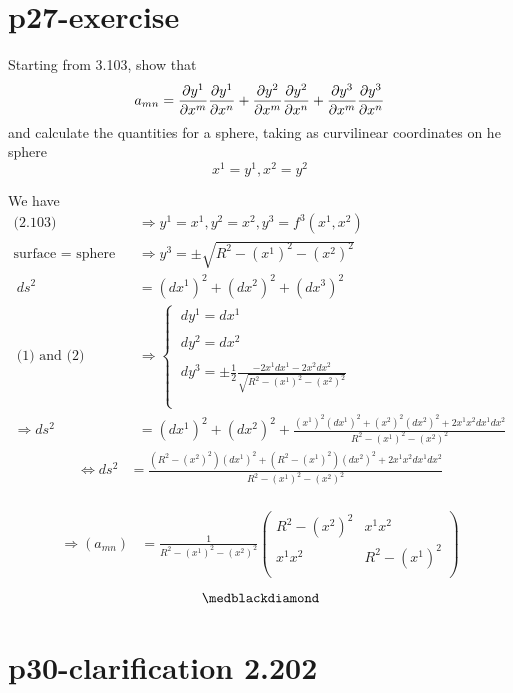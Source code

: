 \section{p27-exercise}

\begin{tcolorbox}
Starting from 3.103, show that $$a_{mn} = \pdv{y^1}{x^m}\pdv{y^1}{x^n}+\pdv{y^2}{x^m}\pdv{y^2}{x^n}+\pdv{y^3}{x^m}\pdv{y^3}{x^n}$$ and calculate the quantities for a sphere, taking as curvilinear coordinates on he sphere $$x^1 = y^1 , x^2 = y^2$$
\end{tcolorbox}
We have
\begin{align}
\text{(2.103)}\quad &\Rightarrow y^1 = x^1 , y^2 = x^2, y^3 = f^3(x^1,x^2)\\
\text{surface = sphere}\quad &\Rightarrow y^3 = \pm \sqrt{R^2 -(x^1)^2-(x^2)^2}\\
\ ds^2 &= (dx^1)^2+(dx^2)^2+(dx^3)^2\\
\ \text{(1) and (2)}\quad& \Rightarrow \left\{ \begin{array}{c} 
\ dy^1 = dx^1\\\\
\ dy^2 = dx^2\\\\
\ dy^3 = \pm \frac{1}{2} \frac{-2x^1dx^1 - 2x^2dx^2}{\sqrt{R^2 -(x^1)^2-(x^2)^2}}\\\\
\end{array}
\right.\\
\Rightarrow ds^2 & = (dx^1)^2 +  (dx^2)^2 + \frac{(x^1)^2(dx^1)^2 + (x^2)^2(dx^2)^2  + 2 x^1x^2dx^1dx^2}{R^2 -(x^1)^2-(x^2)^2}
\end{align}
\begin{align}
\Leftrightarrow ds^2 & = \frac{(R^2 - (x^2)^2) (dx^1)^2 + (R^2 -(x^1)^2) (dx^2)^2  + 2 x^1x^2dx^1dx^2}{R^2 -(x^1)^2-(x^2)^2}
\end{align}\\
\begin{align}
\Rightarrow (a_{mn}) &= \frac{1}{R^2 -(x^1)^2-(x^2)^2}\begin{pmatrix}
 R^2 - (x^2)^2&x^1x^2 \\
x^1x^2 & R^2 - (x^1)^2 \\
\end{pmatrix}
\end{align}
$$\medblackdiamond$$
\newpage


\section{p30-clarification 2.202}

